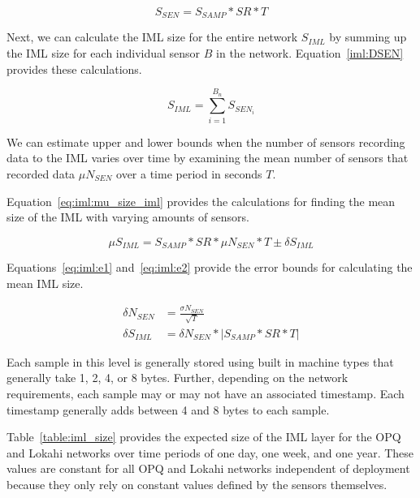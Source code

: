\begin{equation}\label{iml:SSEN}
	S_{SEN} = S_{SAMP} * SR * T
\end{equation}

Next, we can calculate the IML size for the entire network $S_{IML}$ by summing up the IML size for each individual sensor $B$ in the network. Equation~\ref{iml:DSEN} provides these calculations.

\begin{equation}\label{iml:DSEN}
	S_{IML} = \sum_{i=1}^{B_{n}} S_{SEN_{i}}
\end{equation}

We can estimate upper and lower bounds when the number of sensors recording data to the IML varies over time by examining the mean number of sensors that recorded data $\mu N_{SEN}$ over a time period in seconds $T$.

Equation~\ref{eq:iml:mu_size_iml} provides the calculations for finding the mean size of the IML with varying amounts of sensors.

\begin{equation}\label{eq:iml:mu_size_iml}
\mu S_{IML} = S_{SAMP} * SR * \mu N_{SEN} * T \pm \delta S_{IML}
\end{equation}

Equations~\ref{eq:iml:e1} and~\ref{eq:iml:e2} provide the error bounds for calculating the mean IML size.

\begin{align}
	\delta N_{SEN} &= \frac{\sigma N_{SEN}}{\sqrt{T}} \label{eq:iml:e1} \\
	\delta S_{IML} &= \delta N_{SEN} * |S_{SAMP} * SR * T| \label{eq:iml:e2}
\end{align}

Each sample in this level is generally stored using built in machine types that generally take 1, 2, 4, or 8 bytes. Further, depending on the network requirements, each sample may or may not have an associated timestamp. Each timestamp generally adds between 4 and 8 bytes to each sample.

Table~\ref{table:iml_size} provides the expected size of the IML layer for the OPQ and Lokahi networks over time periods of one day, one week, and one year. These values are constant for all OPQ and Lokahi networks independent of deployment because they only rely on constant values defined by the sensors themselves.

